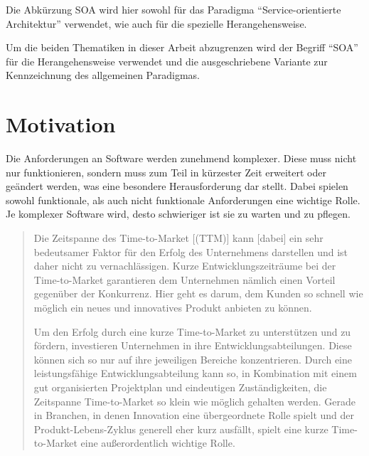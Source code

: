 Die Abkürzung SOA wird hier sowohl für das Paradigma "`Service-orientierte Architektur"' verwendet, wie auch für die spezielle Herangehensweise.

Um die beiden Thematiken in dieser Arbeit abzugrenzen wird der Begriff "`SOA"' für die Herangehensweise verwendet und die ausgeschriebene Variante zur Kennzeichnung des allgemeinen Paradigmas.



\section{Motivation}
\label{sec:motivation}
Die Anforderungen an Software werden zunehmend komplexer. Diese muss nicht nur funktionieren, sondern muss zum Teil in kürzester Zeit erweitert oder geändert werden, was eine besondere Herausforderung dar stellt. Dabei spielen sowohl funktionale, als auch nicht funktionale Anforderungen eine wichtige Rolle. Je komplexer Software wird, desto schwieriger ist sie zu warten und zu pflegen. 

\begin{quotation}
\frqq Die Zeitspanne des Time-to-Market [(TTM)] kann [dabei] ein sehr bedeutsamer Faktor für den Erfolg des Unternehmens darstellen und ist daher nicht zu vernachlässigen. Kurze Entwicklungszeiträume bei der Time-to-Market garantieren dem Unternehmen nämlich einen Vorteil gegenüber der Konkurrenz. Hier geht es darum, dem Kunden so schnell wie möglich ein neues und innovatives Produkt anbieten zu können.
    
Um den Erfolg durch eine kurze Time-to-Market zu unterstützen und zu fördern, investieren Unternehmen in ihre Entwicklungsabteilungen. Diese können sich so nur auf ihre jeweiligen Bereiche konzentrieren. Durch eine leistungsfähige Entwicklungsabteilung kann so, in Kombination mit einem gut organisierten Projektplan und eindeutigen Zuständigkeiten, die Zeitspanne Time-to-Market so klein wie möglich gehalten werden. Gerade in Branchen, in denen Innovation eine übergeordnete Rolle spielt und der Produkt-Lebens-Zyklus generell eher kurz ausfällt, spielt eine kurze Time-to-Market eine außerordentlich wichtige Rolle.\flqq \cite{ttm}
\end{quotation}

